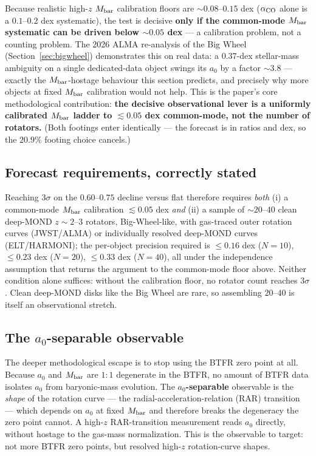 \documentclass[11pt,a4paper]{article}
\newcommand{\Mbar}{M_{\rm bar}}
\newcommand{\azero}{a_0}
\begin{document}
Because realistic high-$z$ $\Mbar$ calibration floors are $\sim0.08$--$0.15$
dex ($\alpha_{\rm CO}$ alone is a $0.1$--$0.2$ dex systematic), the test is
decisive \textbf{only if the common-mode $\Mbar$ systematic can be driven
below $\sim0.05$ dex} --- a calibration problem, not a counting problem. The
2026 ALMA re-analysis of the Big Wheel (Section~\ref{sec:bigwheel})
demonstrates this on real data: a $0.37$-dex stellar-mass ambiguity on a
single dedicated-data object swings its $\azero$ by a factor $\sim3.8$ ---
exactly the $\Mbar$-hostage behaviour this section predicts, and precisely why
more objects at fixed $\Mbar$ calibration would not help. This is the paper's
core methodological contribution: \textbf{the decisive observational lever is
a uniformly calibrated $\Mbar$ ladder to $\lesssim0.05$ dex common-mode, not
the number of rotators.} (Both footings enter identically --- the forecast is
in ratios and dex, so the $20.9\%$ footing choice cancels.)

\subsection{Forecast requirements, correctly stated}
\label{sec:forecastreq}

Reaching $3\sigma$ on the $0.60$--$0.75$ decline versus flat therefore
requires \emph{both} (i) a common-mode $\Mbar$ calibration $\lesssim0.05$ dex
\emph{and} (ii) a sample of $\sim20$--$40$ clean deep-MOND $z\sim2$--$3$
rotators, Big-Wheel-like, with gas-traced outer rotation curves (JWST/ALMA) or
individually resolved deep-MOND curves (ELT/HARMONI); the per-object precision
required is $\le0.16$ dex ($N=10$), $\le0.23$ dex ($N=20$), $\le0.33$ dex
($N=40$), all under the independence assumption that returns the argument to
the common-mode floor above. Neither condition alone suffices: without the
calibration floor, no rotator count reaches $3\sigma$. Clean deep-MOND disks
like the Big Wheel are rare, so assembling $20$--$40$ is itself an
observational stretch.

\subsection{The $a_0$-separable observable}

The deeper methodological escape is to stop using the BTFR zero point at all.
Because $\azero$ and $\Mbar$ are $1{:}1$ degenerate in the BTFR, no amount of
BTFR data isolates $\azero$ from baryonic-mass evolution. The
\textbf{$\azero$-separable} observable is the \emph{shape} of the rotation
curve --- the radial-acceleration-relation (RAR) transition --- which depends
on $\azero$ at fixed $\Mbar$ and therefore breaks the degeneracy the zero
point cannot. A high-$z$ RAR-transition measurement reads $\azero$ directly,
without hostage to the gas-mass normalization. This is the observable to
target: not more BTFR zero points, but resolved high-$z$ rotation-curve
shapes.
\end{document}

